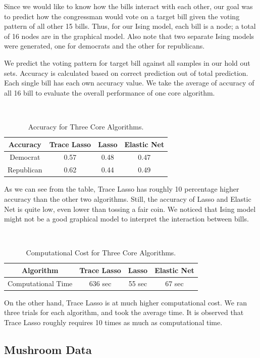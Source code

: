 \documentclass[11pt]{article}
\begin{document}
Since we would like to know how the bills interact with each other, our goal was to predict how the congressman would vote on a target bill given the voting pattern of all other 15 bills. Thus, for our Ising model, each bill is a node; a total of 16 nodes are in the graphical model. Also note that two separate Ising models were generated, one for democrats and the other for republicans.

We predict the voting pattern for target bill against all samples in our hold out sets. Accuracy is calculated based on correct prediction out of total prediction. Each single bill has each own accuracy value. We take the average of accuracy of all 16 bill to evaluate the overall performance of one core algorithm. 

\
\begin{table}[ht]
\centering
\begin{tabular}{c c c c}
\hline
Accuracy & Trace Lasso & Lasso & Elastic Net \\
\hline
Democrat & 0.57 & 0.48 & 0.47 \\
Republican & 0.62 & 0.44 & 0.49 \\
\hline 
\end{tabular}
\caption{Accuracy for Three Core Algorithms.}
\label{table:nonlin} 
\end{table}

As we can see from the table, Trace Lasso has roughly 10 percentage higher accuracy than the other two algorithms. Still, the accuracy of Lasso and Elastic Net is quite low, even lower than tossing a fair coin. We noticed that Ising model might not be a good graphical model to interpret the interaction between bills.


\
\begin{table}[ht]
\centering
\begin{tabular}{c c c c}
\hline
Algorithm & Trace Lasso & Lasso & Elastic Net \\
\hline
Computational Time & 636 sec & 55 sec & 67 sec \\
\hline 
\end{tabular}
\caption{Computational Cost for Three Core Algorithms.}
\label{table:nonlin} 
\end{table}

On the other hand, Trace Lasso is at much higher computational cost. We ran three trials for each algorithm, and took the average time. It is observed that Trace Lasso roughly requires 10 times as much as computational time.

\subsection{Mushroom Data}
\end{document}
